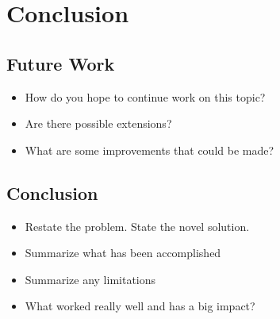 
\glsresetall %
\chapter[Conclusion]{Conclusion}\label{ch:Conclusion}

\section{Future Work}
\begin{itemize}
	\item{How do you hope to continue work on this topic?}
	\item{Are there possible extensions?}
	\item{What are some improvements that could be made?}
\end{itemize}

\section{Conclusion}
\begin{itemize}
	\item{Restate the problem. State the novel solution.}
	\item{Summarize what has been accomplished}
	\item{Summarize any limitations}
	\item{What worked really well and has a big impact?}
\end{itemize}